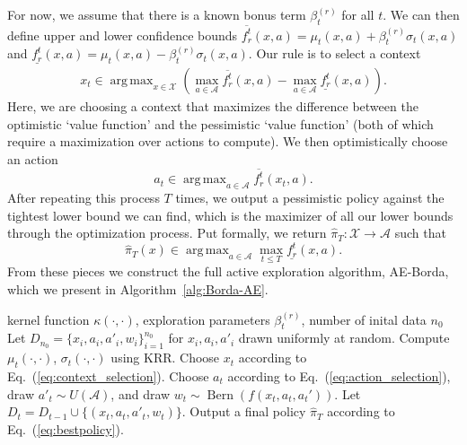 \documentclass{article} \usepackage{iclr2023_conference,times}
\def\eqref#1{Eq.~(\ref{#1})}
\DeclareMathOperator*{\argmax}{arg\,max}
\newcommand{\Contextspace}{\mathcal{X}}
\newcommand{\Actionspace}{\mathcal{A}}
\newcommand{\bestpolicy}{\hat{\pi}_T}
\newcommand{\ainset}{a \in \Actionspace}
\newcommand{\lcbr}{\underline{f_r^t}}
\newcommand{\ucbr}{\overline{f_r^t}}
\newcommand{\bonus}{\beta_t^{(r)}}
\newcommand{\kernel}{\kappa}
\newcommand{\algnm}{AE-Borda}
\newcommand{\xinset}{x \in \Contextspace}
\DeclareMathOperator{\Bernoulli}{Bern}
\newcommand{\preferenceMatrix}{f}
\newcommand{\winner}{w}
\begin{document}
For now, we assume that there is a known bonus term $\bonus$ for all $t$. We can then define upper and lower confidence bounds $\ucbr(x, a) = \mu_t(x, a) + \bonus \sigma_t(x, a)$ and $\lcbr(x, a) = \mu_t(x, a) - \bonus \sigma_t(x, a)$.
Our rule is to select a context
\begin{equation}
\label{eq:context_selection}
\begin{aligned}
    x_t \in \argmax_{\xinset}\left(\max_{\ainset} \ucbr(x, a) - \max_{\ainset}\lcbr(x, a)\right).
\end{aligned}
\end{equation}
Here, we are choosing a context that maximizes the difference between the optimistic `value function' and the pessimistic `value function' (both of which require a maximization over actions to compute).
We then optimistically choose an action
\begin{equation}
\label{eq:action_selection}
    a_t \in \argmax_{\ainset}\ucbr(x_t, a).
\end{equation}
After repeating this process $T$ times, we output a pessimistic policy against the tightest lower bound we can find, which is the maximizer of all our lower bounds through the optimization process. Put formally, we return $\bestpolicy: \Contextspace \to \Actionspace$ such that
\begin{equation}
\label{eq:bestpolicy}
    \bestpolicy(x) \in \argmax_{a \in \Actionspace}\max_{t \leq T}\lcbr(x, a).
\end{equation}
From these pieces we construct the full active exploration algorithm, AE-Borda, which we present in Algorithm~\ref{alg:Borda-AE}.
\begin{algorithm}[t!]
        \caption{\algnm}
        \label{alg:Borda-AE}
        \begin{algorithmic}[1]  kernel function $\kernel(\cdot, \cdot)$, exploration parameters $\bonus$, number of inital data $n_0$
            \STATE Let $D_{n_0} = \{x_i, a_i, a'_i, \winner_i\}_{i=1}^{n_0}$ for $x_i, a_i, a'_i$ drawn uniformly at random.
                \STATE Compute $\mu_t(\cdot, \cdot)$, $\sigma_t(\cdot, \cdot)$ using KRR.
                \STATE Choose $x_t$ according to \eqref{eq:context_selection}.
                \STATE Choose $a_t$ according to \eqref{eq:action_selection}, draw $a'_t\sim U(\Actionspace)$, and draw $\winner_t \sim \Bernoulli(\preferenceMatrix(x_t, a_t, a_t'))$.
                \STATE Let $D_t = D_{t-1} \cup \{(x_t, a_t, a'_t, \winner_t)\}$.
            \ENDFOR
            \STATE Output a final policy $\bestpolicy$ according to \eqref{eq:bestpolicy}.
        \end{algorithmic}
    \end{algorithm}
\end{document}
